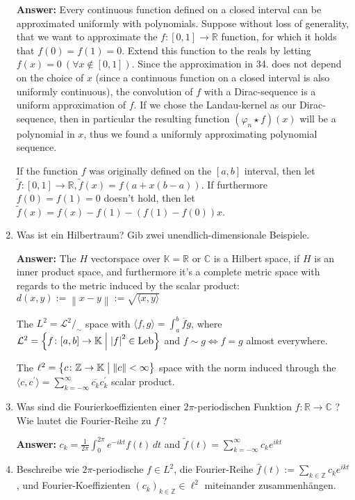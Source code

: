 \documentclass[11pt]{article}
\newcommand{\norm}[1]{\left\lVert#1\right\rVert}
\newcommand{\abs}[1]{\left|#1\right|}
\newcommand{\RR}[0]{\mathbb{R}}
\newcommand{\CC}[0]{\mathbb{C}}
\newcommand{\ZZ}[0]{\mathbb{Z}}
\newcommand{\KK}[0]{\mathbb{K}}
\DeclareMathOperator{\Leb}{Leb}
\begin{document}
\begin{enumerate}
    \textbf{Answer:} Every continuous function defined on a closed interval can be approximated uniformly with polynomials. Suppose without loss of generality, that we want to approximate the $f: [0, 1] \to \RR$ function, for which it holds that $f(0) = f(1) = 0$. Extend this function to the reals by letting $f(x) = 0~(\forall x \notin [0, 1])$. Since the approximation in 34. does not depend on the choice of $x$ (since a continuous function on a closed interval is also uniformly continuous), the convolution of $f$ with a Dirac-sequence is a uniform approximation of $f$. If we chose the Landau-kernel as our Dirac-sequence, then in particular the resulting function $(\varphi_n \star f)(x)$ will be a polynomial in $x$, thus we found a uniformly approximating polynomial sequence.

    If the function $f$ was originally defined on the $[a, b]$ interval, then let $\tilde{f}\colon[0, 1] \to \RR, \tilde{f}(x) = f(a + x(b-a))$. If furthermore $f(0) = f(1) = 0$ doesn't hold, then let $\tilde{f}(x) = f(x) - f(1) - (f(1) - f(0))x.$

    \item Was ist ein Hilbertraum? Gib zwei unendlich-dimensionale Beispiele.

    \textbf{Answer:} The $H$ vectorspace over $\KK=\RR\text{ or }\CC$ is a Hilbert space, if $H$ is an inner product space, and furthermore it's a complete metric space with regards to the metric induced by the scalar product: $d(x, y) := \norm{x - y} := \sqrt{\langle x, y \rangle}$

    The $L^2 = {{\mathcal{L}}^2}/_\sim$ space with $\langle f, g \rangle = \int_a^b \overline{f} g$, where $\mathcal{L}^2 = \left\{f\colon [a, b] \to \KK \Bigm| \abs{f}^2 \in \Leb\right\}$ and $f \sim g \Leftrightarrow f = g$ almost everywhere.

    The $\ell^2 = \left\{c \colon \ZZ \to \KK \bigm| \norm{c} < \infty \right\}$ space with the norm induced through the $\langle c, c^\prime\rangle = \sum_{k=-\infty}^\infty \overline{c_k} c_k^\prime$ scalar product.

    \item Was sind die Fourierkoeffizienten einer $2\pi$-periodischen Funktion $f: \RR \to \CC$ ? Wie lautet die Fourier-Reihe zu $f$ ?

    \textbf{Answer:} $c_k = \frac{1}{2\pi} \int_0^{2\pi} e^{-ikt} f(t) \,dt$ and $\tilde{f}(t) = \sum_{k=-\infty}^\infty c_k e^{ikt}$
    \item Beschreibe wie $2\pi$-periodische $f \in L^2$, die Fourier-Reihe $\hat{f}(t) := \sum_{k\in\ZZ}{c_k e^{ikt}}$, und Fourier-Koeffizienten $(c_k)_{k \in \ZZ} \in \ell^2$ miteinander zusammenhängen.


\end{enumerate}
\end{document}
